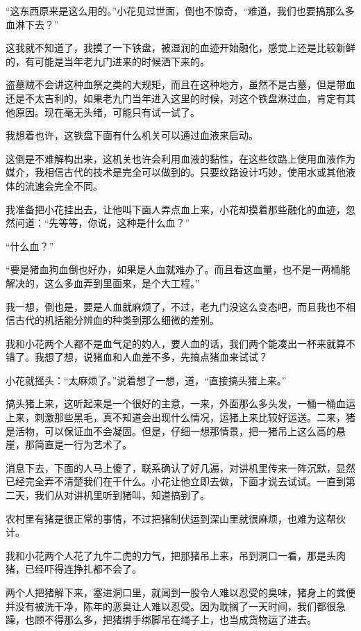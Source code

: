 “这东西原来是这么用的。”小花见过世面，倒也不惊奇，“难道，我们也要搞那么多血淋下去？”

这我就不知道了，我摸了一下铁盘，被湿润的血迹开始融化，感觉上还是比较新鲜的，有可能是当年老九门进来的时候洒下来的。

盗墓贼不会讲这种血祭之类的大规矩，而且在这种地方，虽然不是古墓，但是带血还是不太吉利的，如果老九门当年进入这里的时候，对这个铁盘淋过血，肯定有其他原因。现在毫无头绪，可能只有试一试了。

我想着也许，这铁盘下面有什么机关可以通过血液来启动。

这倒是不难解构出来，这机关也许会利用血液的黏性，在这些纹路上使用血液作为媒介，我相信古代的技术是完全可以做到的。只要纹路设计巧妙，使用水或其他液体的流速会完全不同。

我准备把小花挂出去，让他叫下面人弄点血上来，小花却摸着那些融化的血迹，忽然问道：“先等等，你说，这种是什么血？”

“什么血？”

“要是猪血狗血倒也好办，如果是人血就难办了。而且看这血量，也不是一两桶能解决的，这么多血弄到里面来，是个大工程。”

我一想，倒也是，要是人血就麻烦了，不过，老九门没这么变态吧，而且我也不相信古代的机括能分辨血的种类到那么细微的差别。

我和小花两个人都不是血气足的妁人，要人血的话，我们两个能凑出一杯来就算不错了。我想了想，说猪血和人血差不多，先搞点猪血来试试？

小花就摇头：“太麻烦了。”说着想了一想，道，“直接搞头猪上来。”

搞头猪上来，这听起来是一个很好的主意，一来，外面那么多头发，一桶一桶血运上来，刺激那些黑毛，真不知道会出现什么情况，运猪上来比较好运送。二来，猪是活物，可以保证血不会凝固。但是，仔细一想那情景，把一猪吊上这么高的悬崖，那简直是一行为艺术了。

消息下去，下面的人马上傻了，联系确认了好几遍，对讲机里传来一阵沉默，显然已经完全弄不清楚我们在干什么。小花让他立即去做，下面才说去试试。一直到第二天，我们从对讲机里听到猪叫，知道搞到了。

农村里有猪是很正常的事情，不过把猪制伏运到深山里就很麻烦，也难为这帮伙计。

我和小花两个人花了九牛二虎的力气，把那猪吊上来，吊到洞口一看，那是头肉猪，已经吓得连挣扎都不会了。

两个人把猪解下来，塞进洞口里，就闻到一股令人难以忍受的臭味，猪身上的粪便并没有被洗干净，陈年的恶臭让人难以忍受。因为耽搁了一天时间，我们都很急躁，也顾不得那么多，把猪绑手绑脚吊在绳子上，也当成货物运了进去。

